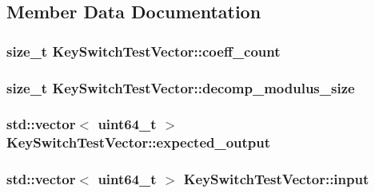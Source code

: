 \subsection{Member Data Documentation}
\hypertarget{structKeySwitchTestVector_a95aa4da3c5518ef78bcc8de60339fcbf}{
\subsubsection[{coeff\-\_\-count}]{\setlength{\rightskip}{0pt plus 5cm}size\-\_\-t Key\-Switch\-Test\-Vector\-::coeff\-\_\-count}}\label{structKeySwitchTestVector_a95aa4da3c5518ef78bcc8de60339fcbf}
\hypertarget{structKeySwitchTestVector_a553ed9a4e56035cc083f2b29cc1d16a6}{
\subsubsection[{decomp\-\_\-modulus\-\_\-size}]{\setlength{\rightskip}{0pt plus 5cm}size\-\_\-t Key\-Switch\-Test\-Vector\-::decomp\-\_\-modulus\-\_\-size}}\label{structKeySwitchTestVector_a553ed9a4e56035cc083f2b29cc1d16a6}
\hypertarget{structKeySwitchTestVector_ad9e47be1cfb9a7be31cfbbd3edfad593}{
\subsubsection[{expected\-\_\-output}]{\setlength{\rightskip}{0pt plus 5cm}std\-::vector$<$ uint64\-\_\-t $>$ Key\-Switch\-Test\-Vector\-::expected\-\_\-output}}\label{structKeySwitchTestVector_ad9e47be1cfb9a7be31cfbbd3edfad593}
\hypertarget{structKeySwitchTestVector_ada92bec84019ee1f4cad5ebdbc1a0be3}{
\subsubsection[{input}]{\setlength{\rightskip}{0pt plus 5cm}std\-::vector$<$ uint64\-\_\-t $>$ Key\-Switch\-Test\-Vector\-::input}}\label{structKeySwitchTestVector_ada92bec84019ee1f4cad5ebdbc1a0be3}
